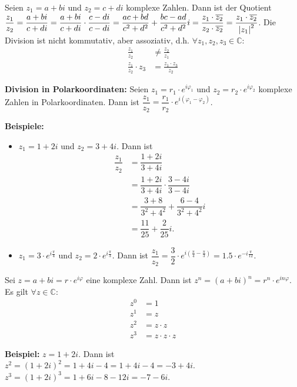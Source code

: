 \documentclass[12pt]{article}
\newcommand{\C}{\mathbb{C}}
\newenvironment{definition}[2][Definition]{\begin{trivlist}
        \item[\hskip \labelsep {\bfseries #1}\hskip \labelsep {\bfseries #2.}]}{\flushright{$\square$}\end{trivlist}}
\begin{document}
\begin{definition}{[Division]}
        Seien $z_1=a+bi$ und $z_2=c+di$ komplexe Zahlen. Dann ist der Quotient $\dfrac{z_1}{z_2}=\dfrac{a+bi}{c+di}=\dfrac{a+bi}{c+di}\cdot\dfrac{c-di}{c-di}=\dfrac{ac+bd}{c^2+d^2}+\dfrac{bc-ad}{c^2+d^2}i=\dfrac{z_1\cdot\overline{z_2}}{z_2\cdot\overline{z_2}}=\dfrac{z_1\cdot\overline{z_2}}{\abs{z_1}^2}$. Die Division ist nicht kommutativ, aber assoziativ, d.h. $\forall z_1,z_2,z_3\in\C$:
        \begin{align*}
                \frac{z_1}{z_2}          & \neq\frac{z_2}{z_1}       \\
                \frac{z_1}{z_2}\cdot z_3 & =\frac{z_1\cdot z_3}{z_2}
        \end{align*}

        \textbf{Division in Polarkoordinaten:} Seien $z_1=r_1\cdot e^{i\varphi_1}$ und $z_2=r_2\cdot e^{i\varphi_2}$ komplexe Zahlen in Polarkoordinaten. Dann ist $\dfrac{z_1}{z_2}=\dfrac{r_1}{r_2}\cdot e^{i(\varphi_1-\varphi_2)}$.

        \textbf{Beispiele:}
        \begin{itemize}
                \item[(1)] $z_1=1+2i$ und $z_2=3+4i$. Dann ist
                      \begin{align*}
                              \dfrac{z_1}{z_2} & =\dfrac{1+2i}{3+4i}                         \\
                                               & =\dfrac{1+2i}{3+4i}\cdot\dfrac{3-4i}{3-4i}  \\
                                               & =\dfrac{3+8}{3^2+4^2}+\dfrac{6-4}{3^2+4^2}i \\
                                               & =\dfrac{11}{25}+\dfrac{2}{25}i.
                      \end{align*}
                \item[(2)] $z_1=3\cdot e^{i\frac{\pi}{4}}$ und $z_2=2\cdot e^{i\frac{\pi}{3}}$. Dann ist $\dfrac{z_1}{z_2}=\dfrac{3}{2}\cdot e^{i\left(\frac{\pi}{4}-\frac{\pi}{3}\right)}=1.5\cdot e^{-i\frac{\pi}{12}}$.
        \end{itemize}

\end{definition}

\begin{definition}{[Potenzieren]}
        Sei $z=a+bi=r\cdot{e}^{i\varphi}$ eine komplexe Zahl. Dann ist $z^n=(a+bi)^n=r^n\cdot{e}^{in\varphi}$. Es gilt $\forall z\in\C$:
        \begin{align*}
                z^0 & =1               \\
                z^1 & =z               \\
                z^2 & =z\cdot z        \\
                z^3 & =z\cdot z\cdot z
        \end{align*}

        \textbf{Beispiel:} $z=1+2i$. Dann ist $z^2=(1+2i)^2=1+4i-4=1+4i-4=-3+4i$. $z^3=(1+2i)^3=1+6i-8-12i=-7-6i$.
\end{definition}
\end{document}
